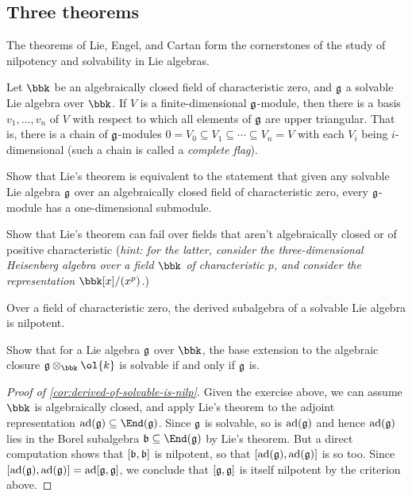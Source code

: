 \subsection{Three theorems} The theorems of Lie, Engel, and Cartan
form the cornerstones of the study of nilpotency and solvability in Lie algebras.

\begin{theorem}
    Let $\bbk$ be an algebraically closed field of characteristic zero, and
    $\mathfrak{g}$ a solvable Lie algebra over $\bbk$. If $V$ is a finite-dimensional
    $\mathfrak{g}$-module, then there is a basis $v_1,\ldots, v_n$ of $V$
    with respect to which all elements of $\mathfrak{g}$ are upper triangular.
    That is, there is a chain of $\mathfrak{g}$-modules $0=V_0\subseteq V_1\subseteq
    \cdots \subseteq V_n = V$ with each $V_i$ being $i$-dimensional (such a
    chain is called a \emph{complete flag}).
\end{theorem}

\begin{exercise}
    Show that Lie's theorem is equivalent to the statement that given any solvable
    Lie algebra $\mathfrak{g}$ over an algebraically closed field of characteristic
    zero, every $\mathfrak{g}$-module has a one-dimensional submodule. 
\end{exercise}

\begin{exercise}
    Show that Lie's theorem can fail over fields that aren't algebraically
    closed or of positive characteristic (\emph{hint: for the latter, consider
    the three-dimensional Heisenberg algebra over a field $\bbk$ of
    characteristic $p$, and consider the representation $\bbk[x]/(x^p)$.})
\end{exercise}

\begin{corollary}\label{cor:derived-of-solvable-is-nilp}
    Over a field of characteristic zero, the derived subalgebra of a solvable
    Lie algebra is nilpotent.
\end{corollary}

\begin{exercise}
    Show that for a Lie algebra $\mathfrak{g}$ over $\bbk$, the base extension to the
    algebraic closure $\frakg\otimes_\bbk \ol{k}$ is solvable if and only if
    $\mathfrak{g}$ is.
\end{exercise}

\begin{proof}[Proof of \cref{cor:derived-of-solvable-is-nilp}]
        Given the exercise above, we can assume $\bbk$ is algebraically closed,
        and apply Lie's theorem to the adjoint representation
        $\adj(\frakg)\subseteq \End(\frakg)$. Since $\mathfrak{g}$ is solvable, so is
        $\textnormal{ad}(\mathfrak{g})$ and hence $\textnormal{ad}(\mathfrak{g})$ lies in the Borel subalgebra
        $\bb\subseteq \End(\frakg)$ by Lie's theorem. But a direct computation
        shows that $[\mathfrak{b}, \mathfrak{b}]$ is nilpotent, so that $[\textnormal{ad}(\mathfrak{g}),
        \textnormal{ad}(\mathfrak{g})]$ is so too. Since $[\textnormal{ad}(\mathfrak{g}), \textnormal{ad}(\mathfrak{g})] =
        \textnormal{ad}[\mathfrak{g}, \mathfrak{g}]$, we conclude that $[\mathfrak{g}, \mathfrak{g}]$ is itself
        nilpotent by the criterion above.
\end{proof}

